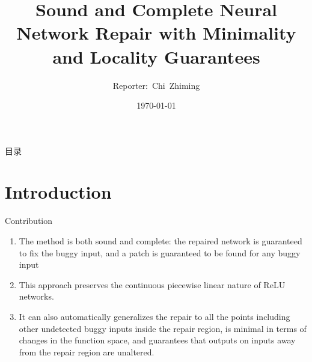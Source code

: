 \documentclass[aspectratio=169 %
,serif,mathserif]{beamer}
\begin{document}
\title{Sound and Complete Neural Network Repair with Minimality and Locality Guarantees} %
\author[Chi~Zhiming]{Reporter:~Chi~Zhiming} %
\institute[ISCAS] %
{	
}
	\CTEXoptions[today=old]
	\date{\today} %
\begin{frame}[plain]\vspace{1.5em}
\titlepage\vspace{-0.5cm}
\end{frame}
\begin{frame}{目录}
\tableofcontents
\end{frame}

\section{Introduction} %

\begin{frame}{Contribution}
\begin{enumerate}
	\item The method is both sound and complete: the repaired network is guaranteed to fix the buggy input, and a patch is guaranteed to be found for any buggy input  \pause
	\item This approach preserves the continuous piecewise linear nature of ReLU networks. \pause
	\item It can also automatically generalizes the repair to all the points including other undetected buggy inputs inside the repair region, is minimal in terms of changes in the function space, and guarantees that outputs on inputs away from the repair region are unaltered. 	
\end{enumerate}
\end{frame}
\end{document}
